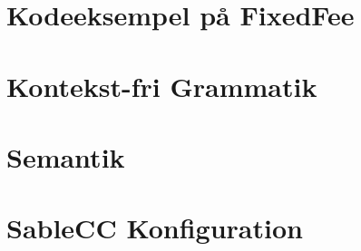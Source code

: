 \appendix

\chapter{Kodeeksempel på FixedFee}
\label{bil:fixedfee}
%

\label{FIRSTAPPENDIX} %

\chapter{Kontekst-fri Grammatik}
\label{bil:cfg}


\chapter{Semantik}
\label{bil:semantik}


\chapter{SableCC Konfiguration}
\label{bil:sablecc}


%


%

%

\label{LASTAPPENDIX}
